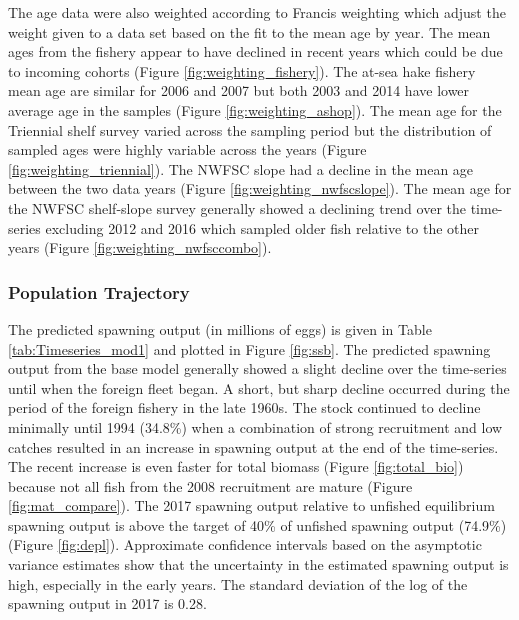 \documentclass[12pt,]{article}
\begin{document}
The age data were also weighted according to Francis weighting which
adjust the weight given to a data set based on the fit to the mean age
by year. The mean ages from the fishery appear to have declined in
recent years which could be due to incoming cohorts (Figure
\ref{fig:weighting_fishery}). The at-sea hake fishery mean age are
similar for 2006 and 2007 but both 2003 and 2014 have lower average age
in the samples (Figure \ref{fig:weighting_ashop}). The mean age for the
Triennial shelf survey varied across the sampling period but the
distribution of sampled ages were highly variable across the years
(Figure \ref{fig:weighting_triennial}). The NWFSC slope had a decline in
the mean age between the two data years (Figure
\ref{fig:weighting_nwfscslope}). The mean age for the NWFSC shelf-slope
survey generally showed a declining trend over the time-series excluding
2012 and 2016 which sampled older fish relative to the other years
(Figure \ref{fig:weighting_nwfsccombo}).

\subsubsection{Population Trajectory}\label{population-trajectory}

The predicted spawning output (in millions of eggs) is given in Table
\ref{tab:Timeseries_mod1} and plotted in Figure \ref{fig:ssb}. The
predicted spawning output from the base model generally showed a slight
decline over the time-series until when the foreign fleet began. A
short, but sharp decline occurred during the period of the foreign
fishery in the late 1960s. The stock continued to decline minimally
until 1994 (34.8\%) when a combination of strong recruitment and low
catches resulted in an increase in spawning output at the end of the
time-series. The recent increase is even faster for total biomass
(Figure \ref{fig:total_bio}) because not all fish from the 2008
recruitment are mature (Figure \ref{fig:mat_compare}). The 2017 spawning
output relative to unfished equilibrium spawning output is above the
target of 40\% of unfished spawning output (74.9\%) (Figure
\ref{fig:depl}). Approximate confidence intervals based on the
asymptotic variance estimates show that the uncertainty in the estimated
spawning output is high, especially in the early years. The standard
deviation of the log of the spawning output in 2017 is 0.28.
\end{document}
